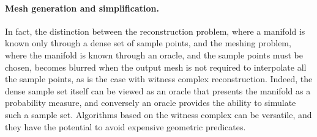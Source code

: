 






\paragraph{Mesh generation and simplification.}

In fact, the distinction between the reconstruction problem, where a
manifold is known only through a dense set of sample points, and the
meshing problem, where the manifold is known through an oracle, and
the sample points must be chosen, becomes blurred when the output mesh
is not required to interpolate all the sample points, as is the case
with witness complex reconstruction. Indeed, the dense sample set
itself can be viewed as an oracle that presents the manifold as a
probability measure, and conversely an oracle provides the ability to
simulate such a sample set. Algorithms based on the witness complex
can be versatile, and they have the potential to avoid expensive
geometric predicates.


